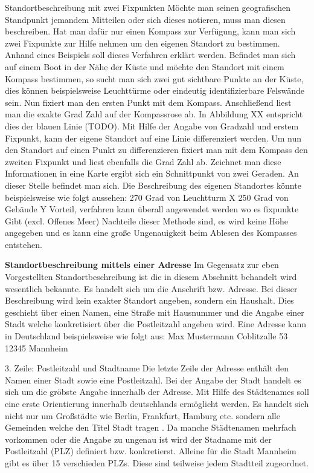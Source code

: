 Standortbeschreibung mit zwei Fixpunkten
Möchte man seinen geografischen Standpunkt jemandem Mitteilen oder sich dieses notieren, muss man diesen beschreiben. Hat man dafür nur einen Kompass zur Verfügung, kann man sich zwei Fixpunkte zur Hilfe nehmen um den eigenen Standort zu bestimmen.
Anhand eines Beispiels soll dieses Verfahren erklärt werden. Befindet man sich auf einem Boot in der Nähe der Küste und möchte den Standort mit einem Kompass bestimmen, so sucht man sich zwei gut sichtbare Punkte an der Küste, dies können beispielsweise Leuchttürme oder eindeutig identifizierbare Felswände sein. Nun fixiert man den ersten Punkt mit dem Kompass. Anschließend liest man die exakte Grad Zahl auf der Kompassrose ab.  In Abbildung XX entspricht dies der blauen Linie (TODO). Mit Hilfe der Angabe von Gradzahl und erstem Fixpunkt, kann der eigene Standort auf eine Linie differenziert werden. Um nun den Standort auf einen Punkt zu differenzieren fixiert man mit dem Kompass den zweiten Fixpunkt und liest ebenfalls die Grad Zahl ab. Zeichnet man diese Informationen in eine Karte ergibt sich ein Schnittpunkt von zwei Geraden. An dieser Stelle befindet man sich. Die Beschreibung des eigenen Standortes könnte beispielsweise wie folgt aussehen:
270 Grad von Leuchtturm X
250 Grad von Gebäude Y
Vorteil, verfahren kann überall angewendet werden wo es fixpunkte Gibt (excl. Offenes Meer)
Nachteile dieser Methode sind, es wird keine Höhe angegeben und es kann eine große Ungenauigkeit beim Ablesen des Kompasses entstehen.

\textbf{Standortbeschreibung mittels einer Adresse}
Im Gegensatz zur eben Vorgestellten Standortbeschreibung ist die in diesem Abschnitt behandelt wird wesentlich bekannte. Es handelt sich um die Anschrift bzw. Adresse. Bei dieser Beschreibung wird kein exakter Standort angeben, sondern ein Haushalt. Dies geschieht über einen Namen, eine Straße mit Hausnummer und die Angabe einer Stadt welche konkretisiert über die Postleitzahl angeben wird.  
Eine Adresse kann in Deutschland beispielsweise wie folgt aus:
Max Mustermann 
Coblitzalle 53
12345 Mannheim

3. Zeile: Postleitzahl und Stadtname
Die letzte Zeile der Adresse enthält den Namen einer Stadt sowie eine Postleitzahl. Bei der Angabe der Stadt handelt es sich um die gröbste Angabe innerhalb der Adresse. Mit Hilfe des Städtenames soll eine erste Orientierung innerhalb deutschlands ermöglicht werden. Es handelt sich nicht nur um Großstädte wie Berlin, Frankfurt, Hamburg etc. sondern alle Gemeinden welche den Titel Stadt tragen .
Da manche Städtenamen mehrfach vorkommen oder die Angabe zu ungenau ist wird der Stadname mit der Postleitzahl (PLZ) definiert bzw. konkretierst. Alleine für die Stadt Mannheim gibt es über 15 verschieden PLZs. Diese sind teilweise jedem Stadtteil zugeordnet.

